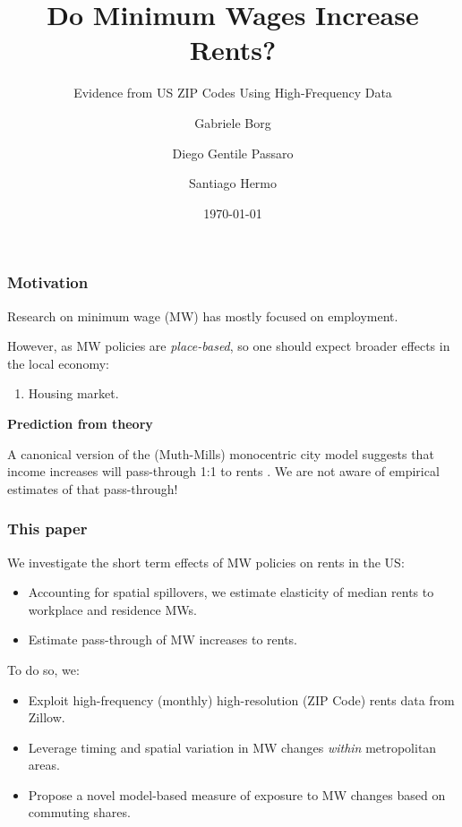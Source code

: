 \documentclass[aspectratio=169, t]{beamer}
\title{Do Minimum Wages Increase Rents?}
\subtitle{Evidence from US ZIP Codes Using High-Frequency Data}
\date{\today}
\author{Gabriele Borg \and Diego Gentile Passaro \and Santiago Hermo}
\institute{$\ \ $ AWS $\ \ \quad\quad\quad\quad\quad\quad$ Brown University $\ \ \ \quad\quad\quad$ Brown University}
\begin{document}
\maketitle



\begin{frame}
	\frametitle{Motivation}
	
	Research on minimum wage (MW) has mostly focused on employment.
	
	\vspace{1.5mm}
	However, as MW policies are \textit{place-based}, so one should expect broader effects 
	in the local economy:
	\begin{enumerate}[$\Rightarrow$]
		\item Housing market.
	\end{enumerate}

	\pause
	\vspace{3mm}
	\textbf{Prediction from theory}
	
	A canonical version of the (Muth-Mills) monocentric city model suggests that income increases will pass-through 1:1 to rents \parencite{Brueckner1987}. \to We are not aware of empirical estimates of that pass-through!
\end{frame}

\begin{frame}
	\frametitle{This paper}
	We investigate the short term effects of MW policies on rents in the US:
	\begin{itemize}
		\vspace{.5mm} \item Accounting for spatial spillovers, we estimate 
		elasticity of median rents to workplace and residence MWs.
		\vspace{.5mm} \item Estimate pass-through of MW increases to rents.
	\end{itemize}
	
	\vspace{3mm}
	\pause
	To do so, we:
	\begin{itemize}
    	\vspace{.5mm} \item Exploit high-frequency (monthly) high-resolution 
    	(ZIP Code) rents data from Zillow.
    	\vspace{.5mm} \item Leverage timing and spatial variation in MW changes 
    	\textit{within} metropolitan areas.
    	\vspace{.5mm} \item Propose a novel model-based measure of exposure to MW changes based on 
    	commuting shares.
	\end{itemize}
\end{frame}
\end{document}

